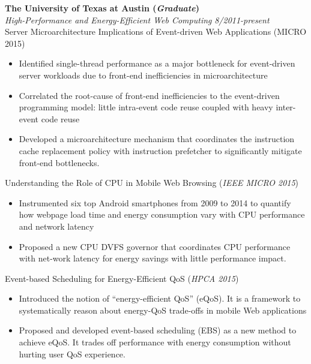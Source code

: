\documentclass[margin, 9pt]{res} %
\begin{document}
\begin{resume}
{\large\textbf{The University of Texas at Austin (\textit{Graduate})}}\\

\vspace*{-7pt}
{\large\textit{High-Performance and Energy-Efficient Web Computing}} \hfill\textit{8/2011-present}\\

\vspace*{-7pt}
Server Microarchitecture Implications of Event-driven Web Applications \hfill(MICRO 2015)\\
\vspace*{-10pt}
\begin{itemize}[leftmargin=*] \itemsep -3pt
\vspace*{-5pt}
	\item Identified single-thread performance as a major bottleneck for event-driven server workloads due to front-end inefficiencies in microarchitecture
	\item Correlated the root-cause of front-end inefficiencies to the event-driven programming model: little intra-event code reuse coupled with heavy inter-event code reuse
	\item Developed a microarchitecture mechanism that coordinates the instruction cache replacement policy with instruction prefetcher to significantly mitigate front-end bottlenecks.
\end{itemize}

\medskip
Understanding the Role of CPU in Mobile Web Browsing \hfill(\textit{IEEE MICRO 2015})\\
\vspace*{-10pt}
\begin{itemize}[leftmargin=*] \itemsep -3pt
\vspace*{-5pt}
	\item Instrumented six top Android smartphones from 2009 to 2014 to quantify how webpage load time and energy consumption vary with CPU performance and network latency
	\item Proposed a new CPU DVFS governor that coordinates CPU performance with net-work latency for energy savings with little performance impact.
\end{itemize}

\medskip
Event-based Scheduling for Energy-Efficient QoS \hfill(\textit{HPCA 2015})\\
\vspace*{-10pt}
\begin{itemize}[leftmargin=*] \itemsep -3pt
\vspace*{-5pt}
	\item Introduced the notion of ``energy-efficient QoS'' (eQoS). It is a framework to systematically reason about energy-QoS trade-offs in mobile Web applications
	\item Proposed and developed event-based scheduling (EBS) as a new method to achieve eQoS. It trades off performance with energy consumption without hurting user QoS experience.
\end{itemize}


\end{resume}
\end{document}
